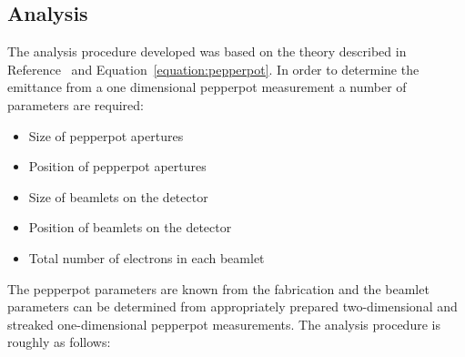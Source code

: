 \subsection{Analysis}
The analysis procedure developed was based on the theory described in Reference~\cite{zhang_emittance_1996} and Equation~\ref{equation:pepperpot}.
In order to determine the emittance from a one dimensional pepperpot measurement a number of parameters are required:
\begin{itemize}
    \item Size of pepperpot apertures
    \item Position of pepperpot apertures
    \item Size of beamlets on the detector
    \item Position of beamlets on the detector
    \item Total number of electrons in each beamlet
\end{itemize}
The pepperpot parameters are known from the fabrication and the beamlet parameters can be determined from appropriately prepared two-dimensional and streaked one-dimensional pepperpot measurements.
The analysis procedure is roughly as follows:
